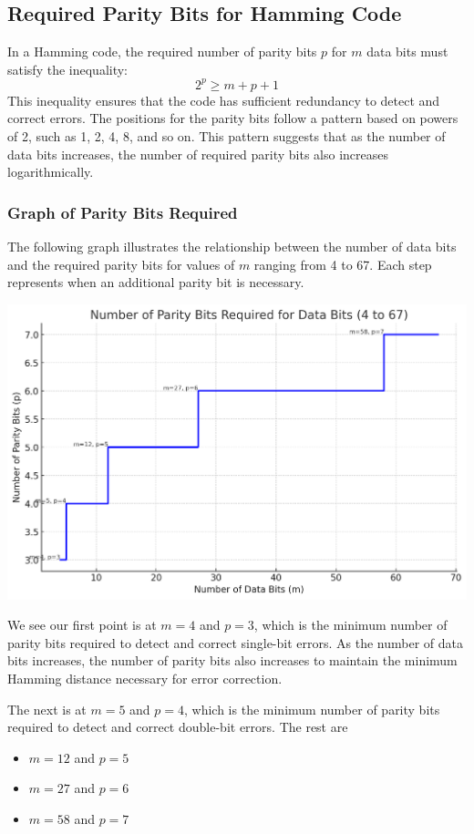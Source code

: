 \documentclass[12pt]{article}
\begin{document}
\subsection*{Required Parity Bits for Hamming Code}
In a Hamming code, the required number of parity bits \( p \) for \( m \) data bits must satisfy the inequality:
\[
	2^p \geq m + p + 1
\]
This inequality ensures that the code has sufficient redundancy to detect and correct errors. The positions for the parity bits follow a pattern based on powers of 2, such as 1, 2, 4, 8, and so on. This pattern suggests that as the number of data bits increases, the number of required parity bits also increases logarithmically.
\subsubsection*{Graph of Parity Bits Required}
The following graph illustrates the relationship between the number of data bits and the required parity bits for values of \( m \) ranging from 4 to 67. Each step represents when an additional parity bit is necessary.


\centerline{\includegraphics[scale=0.65]{examp071}}
We see our first point is at \(m = 4\) and \(p = 3\), which is the minimum number of parity bits required to detect and correct single-bit errors. As the number of data bits increases, the number of parity bits also increases to maintain the minimum Hamming distance necessary for error correction.

The next is at \(m = 5\) and \(p = 4\), which is the minimum number of parity bits required to detect and correct double-bit errors.
The rest are
\begin{itemize}
	\item \(m = 12\) and \(p = 5\)
	\item \(m = 27\) and \(p = 6\)
	\item \(m = 58\) and \(p = 7\)
\end{itemize}
\end{document}
